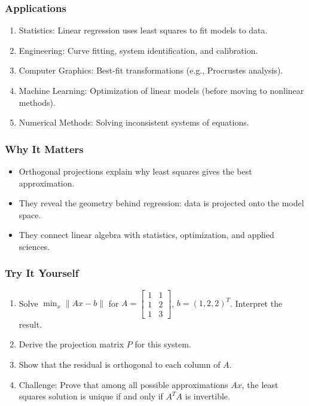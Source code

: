 \documentclass[
  letterpaper,
  DIV=11,
  numbers=noendperiod]{scrreprt}
\providecommand{\tightlist}{%
  \setlength{\itemsep}{0pt}\setlength{\parskip}{0pt}}
\begin{document}
\subsubsection{Applications}\label{applications-38}

\begin{enumerate}
\def\labelenumi{\arabic{enumi}.}
\tightlist
\item
  Statistics: Linear regression uses least squares to fit models to
  data.
\item
  Engineering: Curve fitting, system identification, and calibration.
\item
  Computer Graphics: Best-fit transformations (e.g., Procrustes
  analysis).
\item
  Machine Learning: Optimization of linear models (before moving to
  nonlinear methods).
\item
  Numerical Methods: Solving inconsistent systems of equations.
\end{enumerate}

\subsubsection{Why It Matters}\label{why-it-matters-72}

\begin{itemize}
\tightlist
\item
  Orthogonal projections explain why least squares gives the best
  approximation.
\item
  They reveal the geometry behind regression: data is projected onto the
  model space.
\item
  They connect linear algebra with statistics, optimization, and applied
  sciences.
\end{itemize}

\subsubsection{Try It Yourself}\label{try-it-yourself-75}

\begin{enumerate}
\def\labelenumi{\arabic{enumi}.}
\tightlist
\item
  Solve \(\min_x \|Ax-b\|\) for
  \(A = \begin{bmatrix}1 & 1 \\ 1 & 2 \\ 1 & 3\end{bmatrix}\),
  \(b=(1,2,2)^T\). Interpret the result.
\item
  Derive the projection matrix \(P\) for this system.
\item
  Show that the residual is orthogonal to each column of \(A\).
\item
  Challenge: Prove that among all possible approximations \(Ax\), the
  least squares solution is unique if and only if \(A^T A\) is
  invertible.
\end{enumerate}
\end{document}
